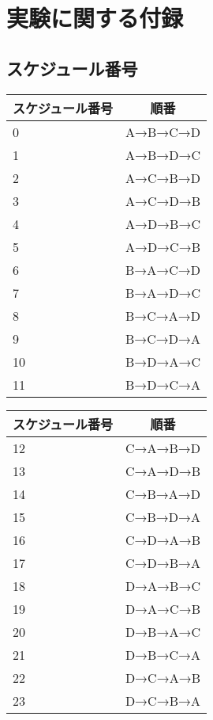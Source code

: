 \chapter{実験に関する付録}\label{apdx:experiment}
\section{スケジュール番号}\label{apdx:schedule}
\begin{table}[ht]
  \begin{minipage}{0.5\hsize}
    \begin{center}
      \small
      \begin{tabular}{l|c} \hline
        スケジュール番号 & 順番 \\ \hline
        0 & A→B→C→D \\
        1 & A→B→D→C \\
        2 & A→C→B→D \\
        3 & A→C→D→B \\
        4 & A→D→B→C \\
        5 & A→D→C→B \\
        6 & B→A→C→D \\
        7 & B→A→D→C \\
        8 & B→C→A→D \\
        9 & B→C→D→A \\
        10 & B→D→A→C \\
        11 & B→D→C→A \\ \hline
      \end{tabular}
    \end{center}
  \end{minipage}
  \begin{minipage}{0.5\hsize}
    \begin{center}
      \small
      \begin{tabular}{l|c} \hline
        スケジュール番号 & 順番 \\ \hline
        12 & C→A→B→D \\
        13 & C→A→D→B \\
        14 & C→B→A→D \\
        15 & C→B→D→A \\
        16 & C→D→A→B \\
        17 & C→D→B→A \\
        18 & D→A→B→C \\
        19 & D→A→C→B \\
        20 & D→B→A→C \\
        21 & D→B→C→A \\
        22 & D→C→A→B \\
        23 & D→C→B→A \\ \hline
      \end{tabular}
    \end{center}
  \end{minipage}
\end{table}
